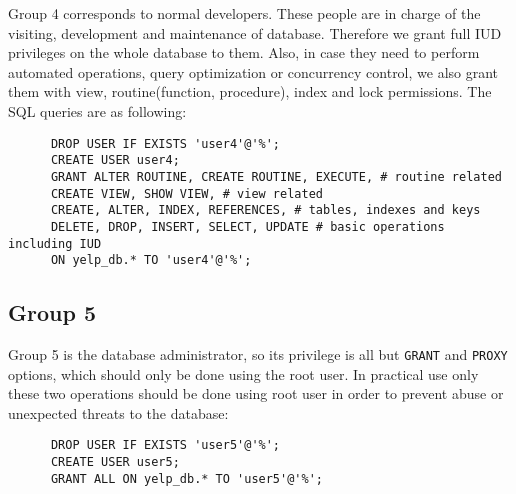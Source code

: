 \documentclass[12pt]{scrbook}
\begin{document}
    Group 4 corresponds to normal developers. These people are in charge of the visiting, development and maintenance of database. Therefore we grant full IUD privileges on the whole database to them. Also, in case they need to perform automated operations, query optimization or concurrency control, we also grant them with view, routine(function, procedure), index and lock permissions. The SQL queries are as following:

    \begin{verbatim}
      DROP USER IF EXISTS 'user4'@'%';
      CREATE USER user4;
      GRANT ALTER ROUTINE, CREATE ROUTINE, EXECUTE, # routine related
      CREATE VIEW, SHOW VIEW, # view related
      CREATE, ALTER, INDEX, REFERENCES, # tables, indexes and keys
      DELETE, DROP, INSERT, SELECT, UPDATE # basic operations including IUD
      ON yelp_db.* TO 'user4'@'%';
    \end{verbatim}

\subsection{Group 5}
    
    Group 5 is the database administrator, so its privilege is all but \texttt{GRANT} and \texttt{PROXY} options, which should only be done using the root user. In practical use only these two operations should be done using root user in order to prevent abuse or unexpected threats to the database:

    \begin{verbatim}
      DROP USER IF EXISTS 'user5'@'%';
      CREATE USER user5;
      GRANT ALL ON yelp_db.* TO 'user5'@'%';
    \end{verbatim}

\end{document}
